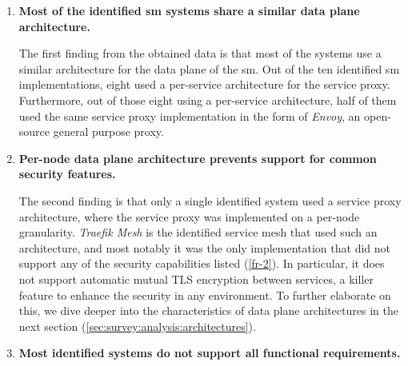 \begin{enumerate}[label=\textbf{F\arabic*}, leftmargin=3\parindent]
    \item \textbf{Most of the identified \gls{sm} systems share a similar data plane architecture.}
    \label{f-1}
    
    The first finding from the obtained data is that most of the systems use a similar architecture for the data plane of the \gls{sm}. Out of the ten identified \gls{sm} implementations, eight used a per-service architecture for the service proxy. Furthermore, out of those eight using a per-service architecture, half of them used the same service proxy implementation in the form of \textit{Envoy}, an open-source general purpose proxy.
    
    \item \textbf{Per-node data plane architecture prevents support for common security features.}
    \label{f-2}
    
    The second finding is that only a single identified system used a service proxy architecture, where the service proxy was implemented on a per-node granularity. \textit{Traefik Mesh} is the identified service mesh that used such an architecture, and most notably it was the only implementation that did not support any of the security capabilities listed (\ref{fr-2}). In particular, it does not support automatic mutual TLS encryption between services, a killer feature to enhance the security in any environment. To further elaborate on this, we dive deeper into the characteristics of data plane architectures in the next section (\cref{sec:survey:analysis:architectures}).

    \item \textbf{Most identified systems do not support all functional requirements.}
    \label{f-3}
    

\end{enumerate}
